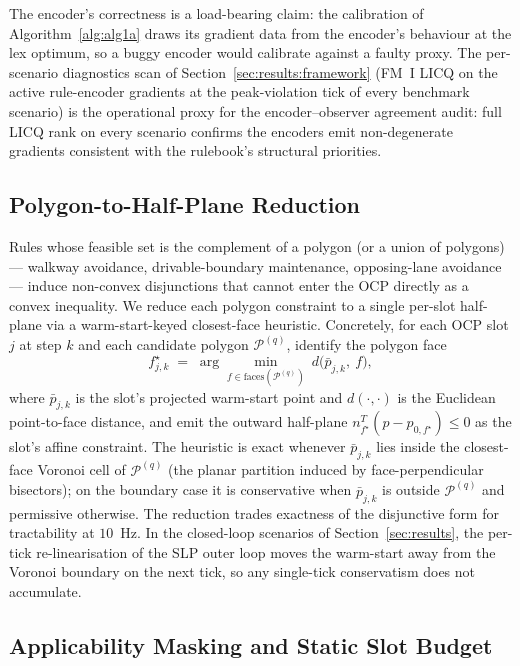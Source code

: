 The encoder's correctness is a load-bearing claim: the calibration of Algorithm~\ref{alg:alg1a} draws its gradient data from the encoder's behaviour at the lex optimum, so a buggy encoder would calibrate against a faulty proxy. The per-scenario diagnostics scan of Section~\ref{sec:results:framework} (FM~I LICQ on the active rule-encoder gradients at the peak-violation tick of every benchmark scenario) is the operational proxy for the encoder--observer agreement audit: full LICQ rank on every scenario confirms the encoders emit non-degenerate gradients consistent with the rulebook's structural priorities.

\subsection{Polygon-to-Half-Plane Reduction}
\label{sec:deployment:polygon}

Rules whose feasible set is the complement of a polygon (or a union of polygons) --- walkway avoidance, drivable-boundary maintenance, opposing-lane avoidance --- induce non-convex disjunctions that cannot enter the OCP directly as a convex inequality. We reduce each polygon constraint to a single per-slot half-plane via a warm-start-keyed closest-face heuristic. Concretely, for each OCP slot $j$ at step $k$ and each candidate polygon $\mathcal{P}^{(q)}$, identify the polygon face
\begin{equation}
    f^{\star}_{j,k} \;=\; \arg\min_{f \in \mathrm{faces}(\mathcal{P}^{(q)})}\ d\!\bigl(\bar{p}_{j,k},\ f\bigr),
    \label{eq:closest-face}
\end{equation}
where $\bar{p}_{j,k}$ is the slot's projected warm-start point and $d(\cdot, \cdot)$ is the Euclidean point-to-face distance, and emit the outward half-plane $n_{f^{\star}}^{T}(p - p_{0,f^{\star}}) \leq 0$ as the slot's affine constraint. The heuristic is exact whenever $\bar{p}_{j,k}$ lies inside the closest-face Voronoi cell of $\mathcal{P}^{(q)}$ (the planar partition induced by face-perpendicular bisectors); on the boundary case it is conservative when $\bar{p}_{j,k}$ is outside $\mathcal{P}^{(q)}$ and permissive otherwise. The reduction trades exactness of the disjunctive form for tractability at $10$~Hz. In the closed-loop scenarios of Section~\ref{sec:results}, the per-tick re-linearisation of the SLP outer loop moves the warm-start away from the Voronoi boundary on the next tick, so any single-tick conservatism does not accumulate.

\subsection{Applicability Masking and Static Slot Budget}
\label{sec:deployment:masks}

